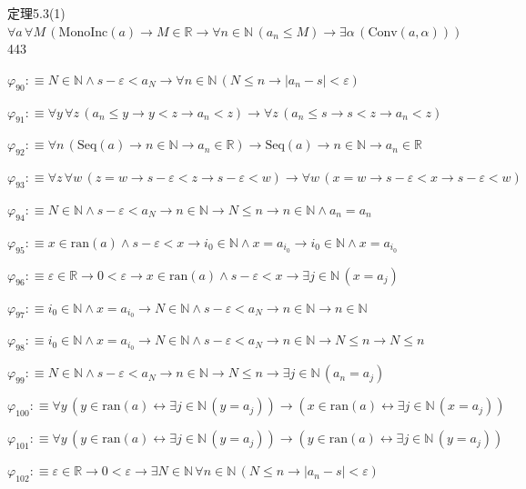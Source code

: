 \begin{fullproof}{定理5.3(1)}{$\forall a\,\forall M\,(\mathrm{MonoInc}(a) \to M \in \mathbb{R} \to \forall n \in \mathbb{N}\,(a_{n} \leq M) \to \exists \alpha\,(\mathrm{Conv}(a,\alpha)))$}{443}
\begin{abbrevlist}
\item $\varphi_{90} :\equiv N \in \mathbb{N} \land s - \varepsilon < a_{N} \to \forall n \in \mathbb{N}\,(N \leq n \to \lvert a_{n} - s \rvert < \varepsilon)$
\item $\varphi_{91} :\equiv \forall y\,\forall z\,(a_{n} \leq y \to y < z \to a_{n} < z) \to \forall z\,(a_{n} \leq s \to s < z \to a_{n} < z)$
\item $\varphi_{92} :\equiv \forall n\,(\mathrm{Seq}(a) \to n \in \mathbb{N} \to a_{n} \in \mathbb{R}) \to \mathrm{Seq}(a) \to n \in \mathbb{N} \to a_{n} \in \mathbb{R}$
\item $\varphi_{93} :\equiv \forall z\,\forall w\,(z = w \to s - \varepsilon < z \to s - \varepsilon < w) \to \forall w\,(x = w \to s - \varepsilon < x \to s - \varepsilon < w)$
\item $\varphi_{94} :\equiv N \in \mathbb{N} \land s - \varepsilon < a_{N} \to n \in \mathbb{N} \to N \leq n \to n \in \mathbb{N} \land a_{n} = a_{n}$
\item $\varphi_{95} :\equiv x \in \mathrm{ran}(a) \land s - \varepsilon < x \to i_{0} \in \mathbb{N} \land x = a_{i_{0}} \to i_{0} \in \mathbb{N} \land x = a_{i_{0}}$
\item $\varphi_{96} :\equiv \varepsilon \in \mathbb{R} \to 0 < \varepsilon \to x \in \mathrm{ran}(a) \land s - \varepsilon < x \to \exists j \in \mathbb{N}\,(x = a_{j})$
\item $\varphi_{97} :\equiv i_{0} \in \mathbb{N} \land x = a_{i_{0}} \to N \in \mathbb{N} \land s - \varepsilon < a_{N} \to n \in \mathbb{N} \to n \in \mathbb{N}$
\item $\varphi_{98} :\equiv i_{0} \in \mathbb{N} \land x = a_{i_{0}} \to N \in \mathbb{N} \land s - \varepsilon < a_{N} \to n \in \mathbb{N} \to N \leq n \to N \leq n$
\item $\varphi_{99} :\equiv N \in \mathbb{N} \land s - \varepsilon < a_{N} \to n \in \mathbb{N} \to N \leq n \to \exists j \in \mathbb{N}\,(a_{n} = a_{j})$
\item $\varphi_{100} :\equiv \forall y\,(y \in \mathrm{ran}(a) \leftrightarrow \exists j \in \mathbb{N}\,(y = a_{j})) \to (x \in \mathrm{ran}(a) \leftrightarrow \exists j \in \mathbb{N}\,(x = a_{j}))$
\item $\varphi_{101} :\equiv \forall y\,(y \in \mathrm{ran}(a) \leftrightarrow \exists j \in \mathbb{N}\,(y = a_{j})) \to (y \in \mathrm{ran}(a) \leftrightarrow \exists j \in \mathbb{N}\,(y = a_{j}))$
\item $\varphi_{102} :\equiv \varepsilon \in \mathbb{R} \to 0 < \varepsilon \to \exists N \in \mathbb{N}\,\forall n \in \mathbb{N}\,(N \leq n \to \lvert a_{n} - s \rvert < \varepsilon)$

\end{abbrevlist}
\end{fullproof}
